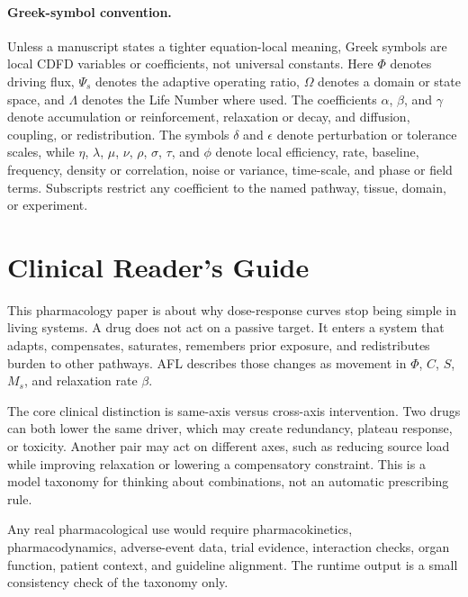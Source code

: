 \documentclass[11pt]{article}
\begin{document}
\paragraph{Greek-symbol convention.}
Unless a manuscript states a tighter equation-local meaning, Greek symbols are local CDFD variables or coefficients, not universal constants. Here $\Phi$ denotes driving flux, $\Psi_s$ denotes the adaptive operating ratio, $\Omega$ denotes a domain or state space, and $\Lambda$ denotes the Life Number where used. The coefficients $\alpha$, $\beta$, and $\gamma$ denote accumulation or reinforcement, relaxation or decay, and diffusion, coupling, or redistribution. The symbols $\delta$ and $\epsilon$ denote perturbation or tolerance scales, while $\eta$, $\lambda$, $\mu$, $\nu$, $\rho$, $\sigma$, $\tau$, and $\phi$ denote local efficiency, rate, baseline, frequency, density or correlation, noise or variance, time-scale, and phase or field terms. Subscripts restrict any coefficient to the named pathway, tissue, domain, or experiment.

\section*{Clinical Reader's Guide}
This pharmacology paper is about why dose-response curves stop being simple in living systems. A drug does not act on a passive target. It enters a system that adapts, compensates, saturates, remembers prior exposure, and redistributes burden to other pathways. AFL describes those changes as movement in $\Phi$, $C$, $S$, $M_s$, and relaxation rate $\beta$.

The core clinical distinction is same-axis versus cross-axis intervention. Two drugs can both lower the same driver, which may create redundancy, plateau response, or toxicity. Another pair may act on different axes, such as reducing source load while improving relaxation or lowering a compensatory constraint. This is a model taxonomy for thinking about combinations, not an automatic prescribing rule.

Any real pharmacological use would require pharmacokinetics, pharmacodynamics, adverse-event data, trial evidence, interaction checks, organ function, patient context, and guideline alignment. The runtime output is a small consistency check of the taxonomy only.


\vspace{0.5em}\noindent{}
\vspace{0.75em}
\end{document}
